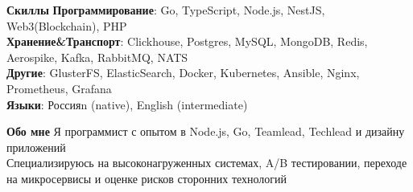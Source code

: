 \documentclass{resume}
\begin{document}
\begin{rSection}{\textbf{Скиллы}}
    \textbf{Программирование}: Go, TypeScript, Node.js, NestJS, Web3(Blockchain), PHP
    \\ \textbf{Хранение\&Транспорт}: Clickhouse, Postgres, MySQL, MongoDB, Redis, Aerospike, Kafka, RabbitMQ, NATS
    \\ \textbf{Другие}: GlusterFS, ElasticSearch, Docker, Kubernetes, Ansible, Nginx, Prometheus, Grafana
    \\ \textbf{Языки}: Россияn (native), English (intermediate)
\end{rSection}

\begin{rSection}{\textbf{Обо мне}}
{
    Я программист с опытом в Node.js, Go, Teamlead, Techlead и дизайну приложений
\\ Специализируюсь на высоконагруженных системах, A/B тестировании, переходе на микросервисы и оценке рисков сторонних технологий
}

\end{rSection}
\end{document}
